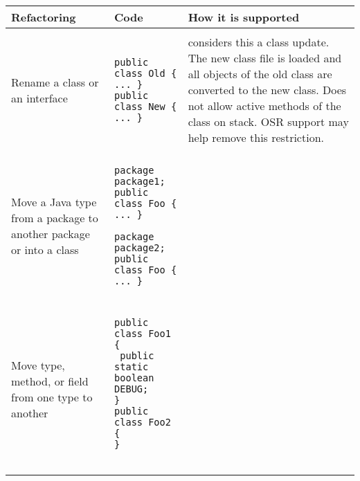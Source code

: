 \begin{table}
\begin{center}
\begin{tabular}[t]{@{}l|l|l@{}}
{\bf Refactoring} & {\bf Code} & {\bf How it is supported} \\ \hline

\begin{minipage}[t]{\LeftColumnWidth}
{\bf Rename type} \\
Rename a class or an interface
\end{minipage} &
\begin{minipage}[t]{\MiddleColumnWidth}
\begin{verbatim}
public class Old { ... }
public class New { ... }
\end{verbatim}
\end{minipage} &
\begin{minipage}[t]{\RightColumnWidth}
\DSU{} considers this a class update. The new class file is loaded and all
objects of the old class are converted to the new class. Does not allow
active methods of the class on stack. OSR support may help remove this
restriction.
\end{minipage} \\ \hline

\begin{minipage}[t]{\LeftColumnWidth}
{\bf Moving Java Elements} \\
Move a Java type from a package to another package or into a class
\end{minipage} &
\begin{minipage}[t]{\MiddleColumnWidth}
\begin{verbatim}
package package1;
public class Foo { ... }

package package2;
public class Foo { ... }
\end{verbatim}
\end{minipage} & \\ \hline

\begin{minipage}[t]{\LeftColumnWidth}
{\bf Move static member} \\
Move type, method, or field from one type to another
\end{minipage} &
\begin{minipage}[t]{\MiddleColumnWidth}
\begin{verbatim}
public class Foo1 {
 public static boolean DEBUG;
}
public class Foo2 {
}


\end{verbatim}
\end{minipage}
\end{tabular}
\end{center}
\end{table}
